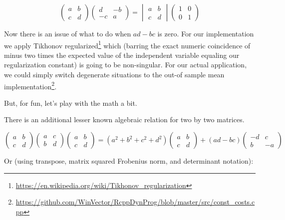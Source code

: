 \documentclass{article}
\begin{document}
\[ 
\begin{pmatrix} a & b \\ c & d \end{pmatrix}
\begin{pmatrix} d & -b \\ -c & a \end{pmatrix}
=
\begin{vmatrix} a & b \\ c & d \end{vmatrix}
\begin{pmatrix} 1 & 0 \\ 0 & 1 \end{pmatrix}
\]



Now there is an issue of what to do when $a d - b c$ is zero.  For our implementation we apply Tikhonov regularized\footnote{\url{https://en.wikipedia.org/wiki/Tikhonov_regularization}} which (barring the exact numeric coincidence of minus two times the expected value of the independent variable equaling our regularization constant) is going to be non-singular.  For our actual application, we could simply switch degenerate situations to the out-of sample mean implementation\footnote{\url{https://github.com/WinVector/RcppDynProg/blob/master/src/const_costs.cpp}}.

But, for fun, let's play with the math a bit.

There is an additional lesser known algebraic relation for two by two matrices.


\[ 
\begin{pmatrix} a & b \\ c & d \end{pmatrix}
\begin{pmatrix} a & c \\ b & d \end{pmatrix}
\begin{pmatrix} a & b \\ c & d \end{pmatrix}
=
(a^2 + b^2 + c^2 + d^2) 
\begin{pmatrix} a & b \\ c & d \end{pmatrix} 
+
(a d - b c)
\begin{pmatrix} -d & c \\ b & -a \end{pmatrix} 
\]

Or (using transpose, matrix squared Frobenius norm, and determinant notation):
\end{document}
